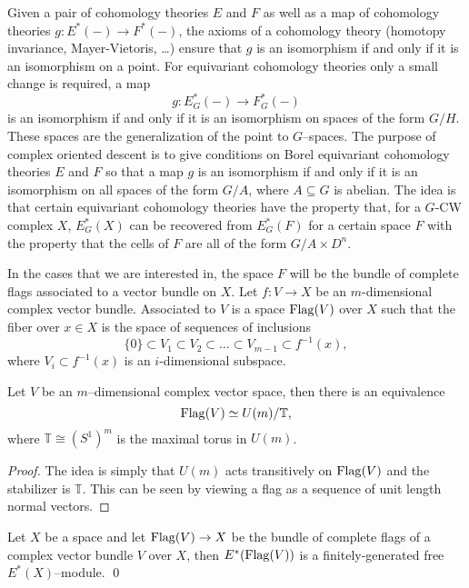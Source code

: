 Given a pair of cohomology theories \(E\) and \(F\) as well as a map of cohomology theories \(g \colon E^*(-) \rightarrow F^*(-)\), the axioms of a cohomology theory (homotopy invariance, Mayer-Vietoris, \ldots) ensure that \(g\) is an isomorphism if and only if it is an isomorphism on a point. For equivariant cohomology theories only a small change is required, a map
\[
g \colon E_{G}^*(-) \rightarrow F_{G}^{*}(-)
\]
is an isomorphism if and only if it is an isomorphism on spaces of the form \(G/H\). These spaces are the generalization of the point to \(G\)--spaces. The purpose of complex oriented descent is to give conditions on Borel equivariant cohomology theories \(E\) and \(F\) so that a map \(g\) is an isomorphism if and only if it is an isomorphism on all spaces of the form \(G/A\), where \(A \subseteq G\) is abelian. The idea is that certain equivariant cohomology theories have the property that, for a \(G\)-CW complex \(X\), \(E_{G}^*(X)\) can be recovered from \(E_{G}^*(F)\) for a certain space \(F\) with the property that the cells of \(F\) are all of the form \(G/A \times D^n\).

In the cases that we are interested in, the space \(F\) will be the bundle of complete flags associated to a vector bundle on \(X\). Let \(f \colon V \rightarrow X\) be an \(m\)-dimensional complex vector bundle. Associated to \(V\) is a space \(\operatorname{Flag}(V)\) over \(X\) such that the fiber over \(x \in X\) is the space of sequences of inclusions
\[
\{0\} \subset V_1 \subset V_2 \subset \ldots \subset V_{m-1} \subset f^{-1}(x),
\]
where \(V_i \subset f^{-1}(x)\) is an \(i\)-dimensional subspace.

\begin{lemma}
Let \(V\) be an \(m\)--dimensional complex vector space, then there is an equivalence
\[
\operatorname{Flag}(V) \simeq U(m)/\mathbb{T},
\]
where \(\mathbb{T} \cong (S^1)^m\) is the maximal torus in \(U(m)\).
\end{lemma}
\begin{proof}
The idea is simply that \(U(m)\) acts transitively on \(\operatorname{Flag}(V)\) and the stabilizer is \(\mathbb{T}\). This can be seen by viewing a flag as a sequence of unit length normal vectors.
\end{proof}


\begin{proposition} \label{finitefreeflags}
Let \(X\) be a space and let \(\operatorname{Flag}(V) \rightarrow X\) be the bundle of complete flags of a complex vector bundle \(V\) over \(X\), then \(E^*(\operatorname{Flag}(V))\) is a finitely-generated free \(E^*(X)\)--module. \pushQED\qed \qedhere \popQED
\end{proposition}

